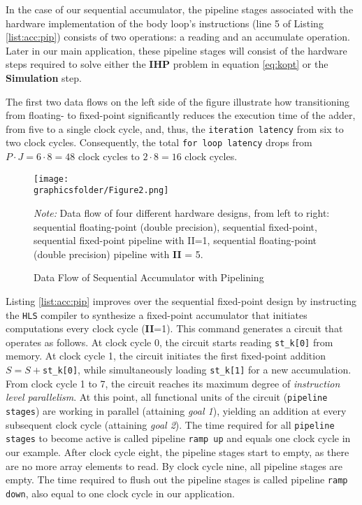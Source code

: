 \documentclass[12pt,american]{article}
\newcommand{\Naccsize}{J}
\newcommand{\graphicsfolder}{./graphics}
\begin{document}
In the case of our sequential accumulator, the pipeline stages associated with the hardware implementation of the body loop's instructions (line 5 of Listing \ref{list:acc:pip}) consists of two operations: a reading and an accumulate operation. Later in our main application, these pipeline stages will consist of the hardware steps required to solve either the \textbf{IHP} problem in equation \eqref{eq:kopt} or the \textbf{Simulation} step.
 
The first two data flows on the left side of the figure illustrate how transitioning from floating- to fixed-point significantly reduces the execution time of the adder, from five to a single clock cycle, and, thus, the \texttt{iteration latency} from six to two clock cycles. Consequently, the total \texttt{for loop latency} drops from $P\cdot \Naccsize=6\cdot8=48$ clock cycles to $2\cdot8=16$ clock cycles. 
 
\begin{figure}[!htbp]
\caption{Data Flow of Sequential Accumulator with Pipelining}
\begin{center}
\texttt{[image: \\graphicsfolder/Figure2.png]}
\end{center}
\label{fig:acc:fix:pip:seq:pip:pipfail}
\small \textit{Note:} Data flow of four different hardware designs, from left to right: sequential floating-point (double precision), sequential fixed-point, sequential fixed-point pipeline with II=1, sequential floating-point (double precision) pipeline with \textbf{II} = 5.
\end{figure}

Listing \ref{list:acc:pip} improves over the sequential fixed-point design by instructing the \texttt{HLS} compiler to synthesize a fixed-point accumulator that initiates computations every clock cycle (\textbf{II}=1). This command generates a circuit that operates as follows. At clock cycle 0, the circuit starts reading \texttt{st\_k[0]} from memory. At clock cycle 1, the circuit initiates the first fixed-point addition $S=S+$\texttt{st\_k[0]}, while simultaneously loading \texttt{st\_k[1]} for a new accumulation. From clock cycle 1 to 7, the circuit reaches its maximum degree of \textit{instruction level parallelism}. At this point, all functional units of the circuit (\texttt{pipeline stages}) are working in parallel (attaining \textit{goal 1}), yielding an addition at every subsequent clock cycle (attaining \textit{goal 2}). The time required for all \texttt{pipeline stages} to become active is called pipeline \texttt{ramp up} and equals one clock cycle in our example. After clock cycle eight, the pipeline stages start to empty, as there are no more array elements to read. By clock cycle nine, all pipeline stages are empty. The time required to flush out the pipeline stages is called pipeline \texttt{ramp down}, also equal to one clock cycle in our application.  
\end{document}
